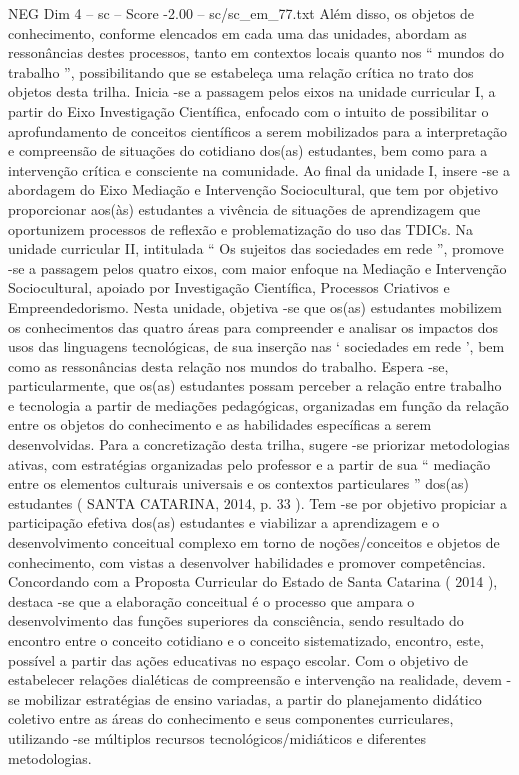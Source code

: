 \begin{textsample}{NEG Dim 4 – sc – Score -2.00 – sc/sc\_em\_77.txt}
Além disso, os objetos de conhecimento, conforme elencados em cada uma das unidades, abordam as ressonâncias destes processos, tanto em contextos locais quanto nos “ mundos do trabalho ”, possibilitando que se estabeleça uma relação crítica no trato dos objetos desta trilha.
Inicia -se a passagem pelos eixos na unidade curricular I, a partir do Eixo Investigação Científica, enfocado com o intuito de possibilitar o aprofundamento de conceitos científicos a serem mobilizados para a interpretação e compreensão de situações do cotidiano dos(as) estudantes, bem como para a intervenção crítica e consciente na comunidade.
Ao final da unidade I, insere -se a abordagem do Eixo Mediação e Intervenção Sociocultural, que tem por objetivo proporcionar aos(às) estudantes a vivência de situações de aprendizagem que oportunizem processos de reflexão e problematização do uso das TDICs.
Na unidade curricular II, intitulada “ Os sujeitos das sociedades em rede ”, promove -se a passagem pelos quatro eixos, com maior enfoque na Mediação e Intervenção Sociocultural, apoiado por Investigação Científica, Processos Criativos e Empreendedorismo.
Nesta unidade, objetiva -se que os(as) estudantes mobilizem os conhecimentos das quatro áreas para compreender e analisar os impactos dos usos das linguagens tecnológicas, de sua inserção nas ‘ sociedades em rede ’, bem como as ressonâncias desta relação nos mundos do trabalho.
Espera -se, particularmente, que os(as) estudantes possam perceber a relação entre trabalho e tecnologia a partir de mediações pedagógicas, organizadas em função da relação entre os objetos do conhecimento e as habilidades específicas a serem desenvolvidas.
Para a concretização desta trilha, sugere -se priorizar metodologias ativas, com estratégias organizadas pelo professor e a partir de sua “ mediação entre os elementos culturais universais e os contextos particulares ” dos(as) estudantes ( SANTA CATARINA, 2014, p. 33 ).
Tem -se por objetivo propiciar a participação efetiva dos(as) estudantes e viabilizar a aprendizagem e o desenvolvimento conceitual complexo em torno de noções/conceitos e objetos de conhecimento, com vistas a desenvolver habilidades e promover competências.
Concordando com a Proposta Curricular do Estado de Santa Catarina ( 2014 ), destaca -se que a elaboração conceitual é o processo que ampara o desenvolvimento das funções superiores da consciência, sendo resultado do encontro entre o conceito cotidiano e o conceito sistematizado, encontro, este, possível a partir das ações educativas no espaço escolar.
Com o objetivo de estabelecer relações dialéticas de compreensão e intervenção na realidade, devem -se mobilizar estratégias de ensino variadas, a partir do planejamento didático coletivo entre as áreas do conhecimento e seus componentes curriculares, utilizando -se múltiplos recursos tecnológicos/midiáticos e diferentes metodologias.

\end{textsample}
